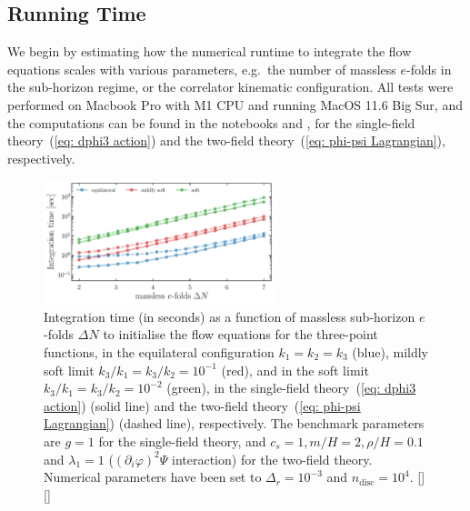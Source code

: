 \documentclass[11pt]{article}
\numberwithin{equation}{section} %
\begin{document}
\subsection{Running Time}
\label{subsec: running time}

We begin by estimating how the numerical runtime to integrate the flow equations scales with various parameters, e.g.~the number of massless $e$-folds in the sub-horizon regime, or the correlator kinematic configuration. All tests were performed on Macbook Pro with M1 CPU and running MacOS 11.6 Big Sur, and the computations can be found in the notebooks \href{https://github.com/deniswerth/CosmoFlow/blob/main/CosmoFlow/Massless_dphi3/Performances.ipynb}{\faGithub} and \href{https://github.com/deniswerth/CosmoFlow/blob/main/CosmoFlow/PhiPsi/Performances.ipynb}{\faGithub}, for the single-field theory~(\ref{eq: dphi3 action}) and the two-field theory~(\ref{eq: phi-psi Lagrangian}), respectively.


\begin{figure}[h!]
  \centering
  \includegraphics[width=0.6\textwidth]{Figures/Performances_massless_efolds.pdf}
  \vspace*{0.2cm}
  \caption{Integration time (in seconds) as a function of massless sub-horizon $e$-folds $\Delta N$ to initialise the flow equations for the three-point functions, in the equilateral configuration $k_1=k_2=k_3$ (\textcolor{pyblue}{blue}), mildly soft limit $k_3/k_1 = k_3/k_2 = 10^{-1}$ (\textcolor{pyred}{red}), and in the soft limit $k_3/k_1 = k_3/k_2 = 10^{-2}$ (\textcolor{pygreen}{green}), in the single-field theory~(\ref{eq: dphi3 action}) (solid line) and the two-field theory~(\ref{eq: phi-psi Lagrangian}) (dashed line), respectively. The benchmark parameters are $g=1$ for the single-field theory, and $c_s=1, m/H = 2, \rho/H = 0.1$ and $\lambda_1 = 1$ ($(\partial_i \varphi)^2\Psi$ interaction) for the two-field theory. Numerical parameters have been set to $\Delta_r = 10^{-3}$ and $n_{\text{disc}} = 10^4$. [\href{https://github.com/deniswerth/CosmoFlow/blob/main/CosmoFlow/PhiPsi/Performances.ipynb}{\faGithub}][\href{https://github.com/deniswerth/CosmoFlow/blob/main/CosmoFlow/Massless_dphi3/Performances.ipynb}{\faGithub}]}
  \label{fig: Performances massles efolds}
\end{figure}
\end{document}
